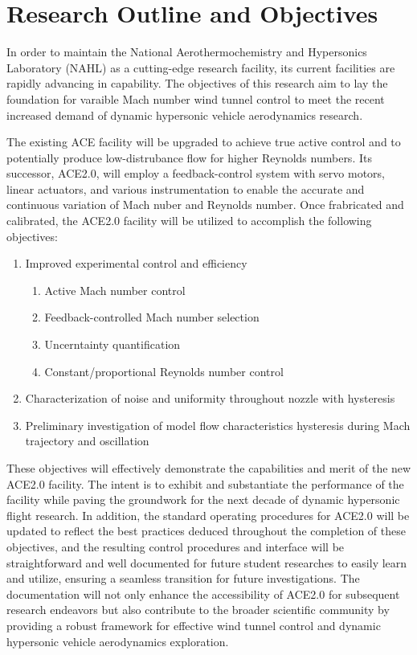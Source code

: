 \section{Research Outline and Objectives}

In order to maintain the National Aerothermochemistry and Hypersonics Laboratory (NAHL) as a cutting-edge research facility, its current facilities are rapidly advancing in capability. The objectives of this research aim to lay the foundation for varaible Mach number wind tunnel control to meet the recent increased demand of dynamic hypersonic vehicle aerodynamics research.

The existing ACE facility will be upgraded to achieve true active control and to potentially produce low-distrubance flow for higher Reynolds numbers. Its successor, ACE2.0, will employ a feedback-control system with servo motors, linear actuators, and various instrumentation to enable the accurate and continuous variation of Mach nuber and Reynolds number. Once frabricated and calibrated, the ACE2.0 facility will be utilized to accomplish the following objectives:

\begin{enumerate}
    \item Improved experimental control and efficiency
        \begin{enumerate}
            \item Active Mach number control
            \item Feedback-controlled Mach number selection
            \item Uncerntainty quantification
            \item Constant/proportional Reynolds number control
        \end{enumerate}
    \item Characterization of noise and uniformity throughout nozzle with hysteresis
    \item Preliminary investigation of model flow characteristics hysteresis during Mach trajectory and oscillation
\end{enumerate}

These objectives will effectively demonstrate the capabilities and merit of the new ACE2.0 facility. The intent is to exhibit and substantiate the performance of the facility while paving the groundwork for the next decade of dynamic hypersonic flight research. In addition, the standard operating procedures for ACE2.0 will be updated to reflect the best practices deduced throughout the completion of these objectives, and the resulting control procedures and interface will be straightforward and well documented for future student researches to easily learn and utilize, ensuring a seamless transition for future investigations. The documentation will not only enhance the accessibility of ACE2.0 for subsequent research endeavors but also contribute to the broader scientific community by providing a robust framework for effective wind tunnel control and dynamic hypersonic vehicle aerodynamics exploration.

